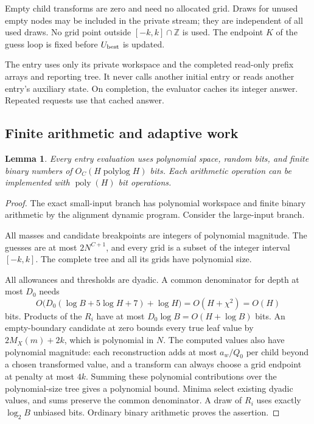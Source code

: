 \documentclass[11pt]{article}
\newtheorem{lemma}[theorem]{Lemma}
\theoremstyle{definition}
\newcommand{\poly}{\operatorname{poly}}
\newcommand{\polylog}{\operatorname{polylog}}
\newcommand{\1}{\mathbf 1}
\begin{document}
Empty child transforms are zero and need no allocated grid. Draws for
unused empty nodes may be included in the private stream; they are
independent of all used draws. No grid point outside
$[-k,k]\cap\mathbb Z$ is used. The endpoint $K$ of the guess loop is
fixed before $U_{\rm best}$ is updated.

The entry uses only its private workspace and the completed read-only
prefix arrays and reporting tree. It never calls another initial entry
or reads another entry's auxiliary state. On completion, the evaluator
caches its integer answer. Repeated requests use that cached answer.

\FloatBarrier

\subsection{Finite arithmetic and adaptive work}

\begin{lemma}\label{seed:lem:finite}
Every entry evaluation uses polynomial space, random bits, and finite
binary numbers of $O_C(H\polylog H)$ bits. Each arithmetic operation
can be implemented with $\poly(H)$ bit operations.
\end{lemma}
\begin{proof}
The exact small-input branch has polynomial workspace and finite binary
arithmetic by the alignment dynamic program. Consider the large-input
branch.

All masses and candidate breakpoints are integers of polynomial magnitude.
The guesses are at most $2N^{C+1}$, and every grid is a subset of the
integer interval $[-k,k]$. The complete tree and all its grids
have polynomial size.

All allowances and thresholds are dyadic. A common denominator for depth
at most $D_0$ needs
\[
 O\bigl(D_0(\log B+5\log H+7)+\log H\bigr)=O(H+\chi^2)=O(H)
\]
bits. Products of the $R_i$ have at most $D_0\log B=O(H+\log B)$ bits.
An empty-boundary candidate at zero bounds every true leaf value by
$2M_X(m)+2k$, which is polynomial in $N$. The computed values also have
polynomial magnitude: each reconstruction adds at most $a_w/Q_0$ per
child beyond a chosen transformed value, and a transform can always
choose a grid endpoint at penalty at most $4k$. Summing these polynomial
contributions over the polynomial-size tree gives a polynomial bound.
Minima select existing dyadic values, and sums preserve the common
denominator. A draw of $R_i$ uses exactly $\log_2B$ unbiased bits.
Ordinary binary arithmetic proves the assertion.
\end{proof}
\end{document}
